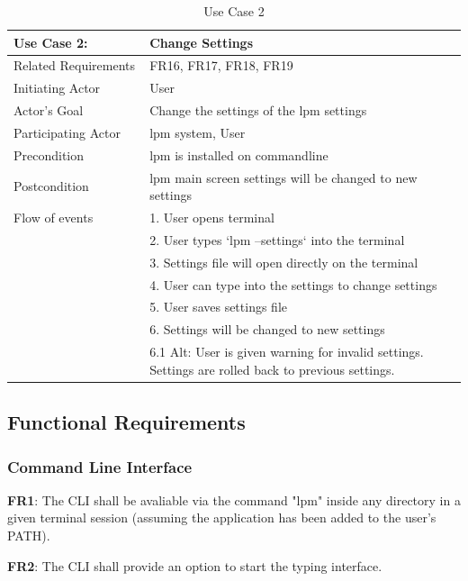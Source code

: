 \documentclass[12pt, titlepage]{article}
\begin{document}
\bigskip
\begin{table}[!htbp]
    \centering
    \begin{tabular}{|p{0.3\linewidth}|p{0.7\linewidth}|}
        \hline
        \textbf{Use Case 2:} & \textbf{Change Settings} \\
        \hline
        Related Requirements & FR16, FR17, FR18, FR19 \\
        \hline
        Initiating Actor & User\\
        \hline
        Actor's Goal & Change the settings of the lpm settings\\
        \hline
        Participating Actor & lpm system, User\\
        \hline
        Precondition & lpm is installed on commandline\\
        \hline
        Postcondition & lpm main screen settings will be changed to new settings\\
        \hline
        Flow of events & 1. User opens terminal \\
        & 2. User types `lpm --settings` into the terminal \\
        & 3. Settings file will open directly on the terminal \\
        & 4. User can type into the settings to change settings \\
        & 5. User saves settings file \\
        & 6. Settings will be changed to new settings \\
        & 6.1 Alt: User is given warning for invalid settings. Settings are rolled back to previous settings. \\
        \hline
    \end{tabular}
    \caption{Use Case 2}
    \label{tab:usecase2}
\end{table}

\subsection{Functional Requirements}
\subsubsection{Command Line Interface}
\noindent \textbf{FR1}: The CLI shall be avaliable via the command "lpm" inside any directory in a given terminal session (assuming the application has been added to the user's PATH).

\noindent \textbf{FR2}: The CLI shall provide an option to start the typing interface.
\end{document}
